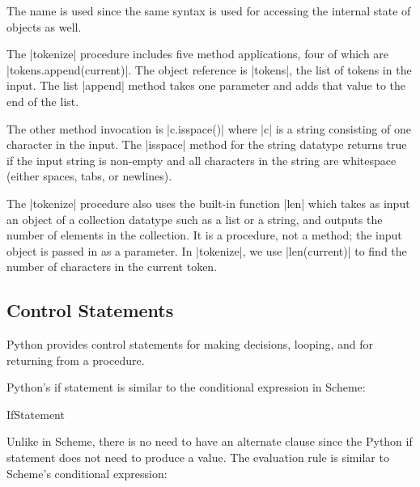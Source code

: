 The name  is used since the same syntax is used for accessing the internal state of objects as well.

The \pycode|tokenize| procedure includes five method applications, four of which are \pycode|tokens.append(current)|.  The object reference is \pycode|tokens|, the list of tokens in the input.  The list \pycode|append| method takes one parameter and adds that value to the end of the list.  

The other method invocation is \pycode|c.isspace()| where \pycode|c| is a string consisting of one character in the input.  The \pycode|isspace| method for the string datatype returns true if the input string is non-empty and all characters in the string are whitespace (either spaces, tabs, or newlines).  

The \pycode|tokenize| procedure also uses the built-in function \pycode|len| which takes as input an object of a collection datatype such as a list or a string, and outputs the number of elements in the collection.  It is a procedure, not a method; the input object is passed in as a parameter.  In \pycode|tokenize|, we use \pycode|len(current)| to find the number of characters in the current token.  

\subsection{Control Statements}

Python provides control statements for making decisions, looping, and for returning from a procedure.

 Python's if statement is similar to the conditional expression in Scheme:

\begin{bnfgrammarm}{IfStatement}
\end{bnfgrammarm}

Unlike in Scheme, there is no need to have an alternate clause since the Python if statement does not need to produce a value.  %
The evaluation rule is similar to Scheme's conditional expression: 

